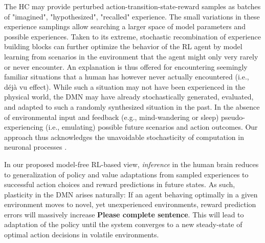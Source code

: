 \documentclass[10pt,letterpaper]{article}
\begin{document}
The HC may provide perturbed action-transition-state-reward samples
  as batches of "imagined", "hypothesized", "recalled" experience.
  The small variations in these experience samplings allow searching
  a larger space of model parameters and possible experiences.
  Taken to its extreme, stochastic recombination of experience
  building blocks can further optimize the behavior of the RL agent
  by model learning from scenarios in the environment that the agent might
  only very rarely or never encounter.
  An explanation is thus offered for encountering seemingly familiar situations that
  a human has however never actually encountered (i.e., d\'{e}j\`{a} vu effect).
  While such a situation may not have been experienced in the physical world,
  the DMN may have already stochastically generated, evaluated, and adapted to
  such a randomly synthesized situation in the past.
  In the absence of environmental input and feedback
  (e.g., mind-wandering or sleep) pseudo-experiencing (i.e., emulating) possible
  future scenarios and action outcomes.
  Our approach thus acknowledges the unavoidable stochasticity of
  computation in neuronal processes \citep{faisal2008noise}.

  In our proposed model-free RL-based view, \textit{inference} in the human brain reduces to
  generalization of
  policy and value adaptations from sampled experiences to
  successful action choices and reward predictions in future states.
  As such,
  plasticity in the DMN arises naturally:
  If an agent behaving optimally in a given environment moves
  to novel, yet unexperienced environments, reward prediction errors will
  massively increase \textbf{Please complete sentence}.
  This will lead to adaptation of the policy until the system converges to a
  new steady-state of optimal action decisions in volatile environments.

\end{document}
